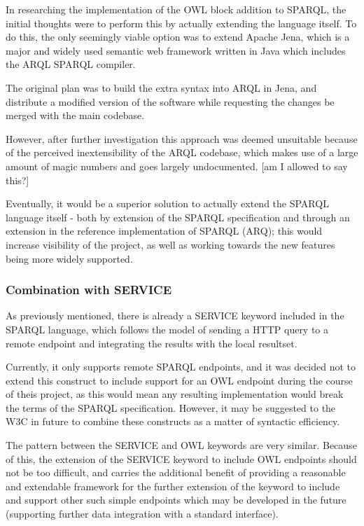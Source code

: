 \documentclass{article}
\begin{document}
In researching the implementation of the OWL block addition to SPARQL, the
initial thoughts were to perform this by actually extending the language itself.
To do this, the only seemingly viable option was to extend Apache Jena, which is
a major and widely used semantic web framework written in Java which includes the 
ARQL SPARQL compiler. 

The original plan was to build the extra syntax into ARQL in Jena, and
distribute a modified version of the software while requesting the changes be
merged with the main codebase.

However, after further investigation this approach was deemed unsuitable because
of the perceived inextensibility of the ARQL codebase, which makes use of a
large amount of magic numbers and goes largely undocumented. [am I allowed to
say this?]

Eventually, it would be a superior solution to actually extend the SPARQL
language itself - both by extension of the SPARQL
specification and through an extension in the reference implementation of SPARQL
(ARQ); this would increase visibility of the
project, as well as working towards the new features being more widely
supported.

\subsubsection{Combination with SERVICE}

As previously mentioned, there is already a SERVICE keyword included in the
SPARQL language, which follows the model of sending a HTTP query to a remote
endpoint and integrating the results with the local resultset. 

Currently, it only supports remote SPARQL endpoints, and it was decided not to 
extend this construct to include support for an OWL endpoint during the course
of theis project, as this would mean any resulting implementation would break 
the terms of the SPARQL specification. However, it may be suggested to the W3C 
in future to combine these constructs as a matter of syntactic efficiency. 

The pattern between the SERVICE and OWL keywords are very
similar. Because of this, the extension of the SERVICE keyword to include OWL
endpoints should not be too difficult, and carries the additional benefit of
providing a reasonable and extendable framework for the further extension of the
keyword to include and support other such simple endpoints which may be
developed in the future (supporting further data integration with a standard
interface).
\end{document}
